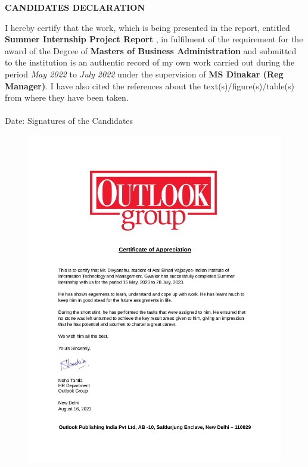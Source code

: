 \newpage
\begin{center}
{\large \bf CANDIDATES DECLARATION}
\end{center}
I hereby certify that the work, which is being presented in the report, entitled {\bf Summer Internship Project Report }, in fulfilment of the requirement for the award of the
Degree of {\bf Masters of Business Administration} and submitted to the institution is an authentic record of my own work carried out
during the period \emph{May 2022} to \emph{July 2022} under the supervision of {\bf MS Dinakar
(Reg Manager)}.
I have also cited the references about the text(s)/figure(s)/table(s) from where they have been taken.\\
\vspace{0.6in} \\
Date: \hspace{3.4in} Signatures of the Candidates \\

\begin{figure}
    \includegraphics[width=\textwidth]{Certificate.jpg}
    \centering
\end{figure}


